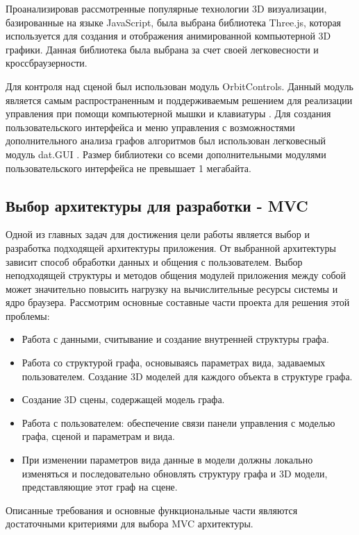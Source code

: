 Проанализировав рассмотренные популярные технологии 3D визуализации, базированные на языке JavaScript, была выбрана библиотека Three.js, которая используется для создания и отображения анимированной компьютерной 3D графики. Данная библиотека была выбрана за счет своей легковесности и кроссбраузерности. 

Для контроля над сценой был использован модуль OrbitControls. Данный модуль является самым распространенным и поддерживаемым решением для реализации управления при помощи компьютерной мышки и клавиатуры \cite{OrbitControls_offc}.  Для создания пользовательского интерфейса и меню управления с возможностями дополнительного анализа графов алгоритмов был использован легковесный модуль dat.GUI \cite{dat_gui_github}. Размер библиотеки со всеми дополнительными модулями пользовательского интерфейса не превышает 1 мегабайта.

\subsection{Выбор архитектуры для разработки - MVC}

Одной из главных задач для достижения цели работы является выбор и разработка подходящей архитектуры приложения. От выбранной архитектуры зависит способ обработки данных и общения с пользователем. Выбор неподходящей структуры и методов общения модулей приложения между собой может значительно повысить нагрузку на вычислительные ресурсы системы и ядро браузера. Рассмотрим основные составные части проекта для решения этой проблемы:

\begin{itemize}
    \item Работа с данными, считывание и создание внутренней структуры графа.
    \item Работа со структурой графа, основываясь параметрах вида, задаваемых пользователем. Создание 3D моделей для каждого объекта в структуре графа.
    \item Создание 3D сцены, содержащей модель графа.
    \item Работа с пользователем: обеспечение связи панели управления с моделью графа, сценой и параметрам и вида.
    \item При изменении параметров вида данные в модели должны локально изменяться и последовательно обновлять структуру графа и 3D модели, представляющие этот граф на сцене.
\end{itemize}

Описанные требования и основные функциональные части являются достаточными критериями для выбора MVC архитектуры. \cite{MVCArchitecture}

